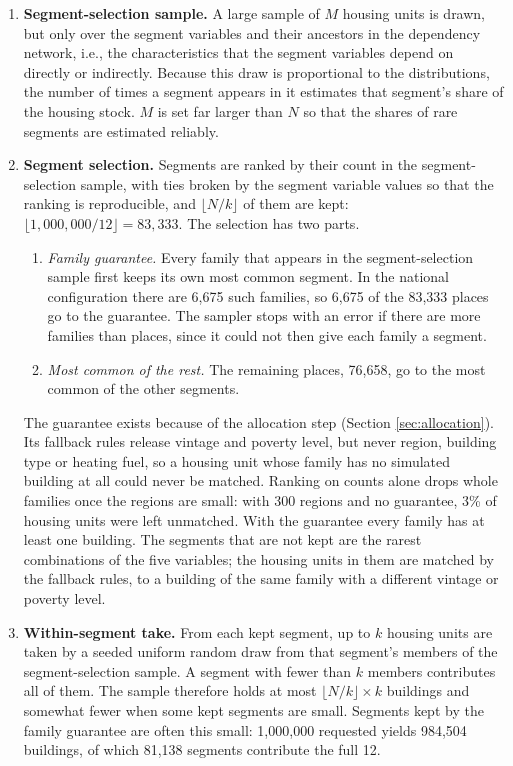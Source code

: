 \begin{enumerate}
    \item \textbf{Segment-selection sample.} A large sample of $M$ housing units is drawn, but only over the segment variables and their ancestors in the dependency network, i.e., the characteristics that the segment variables depend on directly or indirectly. Because this draw is proportional to the distributions, the number of times a segment appears in it estimates that segment's share of the housing stock. $M$ is set far larger than $N$ so that the shares of rare segments are estimated reliably.
    \item \textbf{Segment selection.} Segments are ranked by their count in the segment-selection sample, with ties broken by the segment variable values so that the ranking is reproducible, and $\lfloor N/k \rfloor$ of them are kept: $\lfloor 1{,}000{,}000 / 12 \rfloor = 83{,}333$. The selection has two parts.
    \begin{enumerate}
        \item \textit{Family guarantee.} Every family that appears in the segment-selection sample first keeps its own most common segment. In the national configuration there are 6,675 such families, so 6,675 of the 83,333 places go to the guarantee. The sampler stops with an error if there are more families than places, since it could not then give each family a segment.
        \item \textit{Most common of the rest.} The remaining places, 76,658, go to the most common of the other segments.
    \end{enumerate}
    The guarantee exists because of the allocation step (Section \ref{sec:allocation}). Its fallback rules release vintage and poverty level, but never region, building type or heating fuel, so a housing unit whose family has no simulated building at all could never be matched. Ranking on counts alone drops whole families once the regions are small: with 300 regions and no guarantee, 3\% of housing units were left unmatched. With the guarantee every family has at least one building. The segments that are not kept are the rarest combinations of the five variables; the housing units in them are matched by the fallback rules, to a building of the same family with a different vintage or poverty level.
    \item \textbf{Within-segment take.} From each kept segment, up to $k$ housing units are taken by a seeded uniform random draw from that segment's members of the segment-selection sample. A segment with fewer than $k$ members contributes all of them. The sample therefore holds at most $\lfloor N/k \rfloor \times k$ buildings and somewhat fewer when some kept segments are small. Segments kept by the family guarantee are often this small: 1,000,000 requested yields 984,504 buildings, of which 81,138 segments contribute the full 12.

\end{enumerate}
